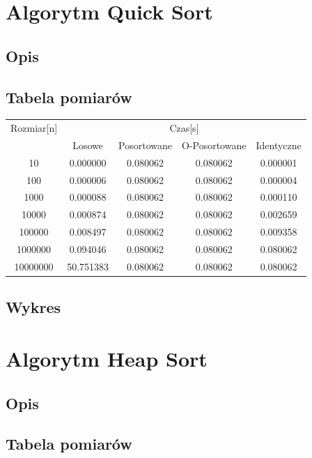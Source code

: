 \documentclass[12pt]{article}
\begin{document}
\section{Algorytm Quick Sort }
\subsection{Opis}
\subsection{Tabela pomiarów}

\begin{center}
\begin{tabular}{ccccc} 
\\ 
\toprule
Rozmiar[n] & \multicolumn{4}{c}{Czas[s]} \\
\cmidrule(r){2-5}
 & Losowe & Posortowane & O-Posortowane & Identyczne \\
\midrule
10       & 0.000000   & 0.080062 & 0.080062  & 0.000001 \\
100      & 0.000006   & 0.080062 & 0.080062  & 0.000004 \\
1000     & 0.000088   & 0.080062 & 0.080062  & 0.000110 \\
10000    & 0.000874   & 0.080062 & 0.080062  & 0.002659 \\
100000   & 0.008497   & 0.080062 & 0.080062  & 0.009358 \\
1000000  & 0.094046   & 0.080062 & 0.080062  & 0.080062 \\
10000000 & 50.751383  & 0.080062 & 0.080062  & 0.080062 \\
\bottomrule
\end{tabular}
\end{center}

\subsection{Wykres}

\section{Algorytm Heap Sort }
\subsection{Opis}
\subsection{Tabela pomiarów}
\end{document}
